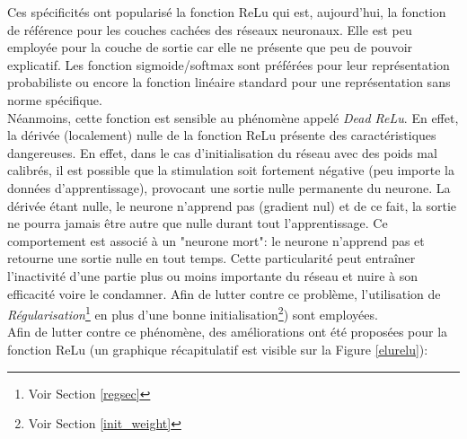 \noindent Ces spécificités ont popularisé la fonction ReLu qui est, aujourd'hui, la fonction de référence pour les couches cachées des réseaux neuronaux. Elle est peu employée pour la couche de sortie car elle ne présente que peu de pouvoir explicatif. Les fonction sigmoide/softmax sont préférées pour leur représentation probabiliste ou encore la fonction linéaire standard pour une représentation sans norme spécifique.\\

\noindent Néanmoins, cette fonction est sensible au phénomène appelé \textit{Dead ReLu}. En effet, la dérivée (localement) nulle de la fonction ReLu présente des caractéristiques dangereuses. En effet, dans le cas d'initialisation du réseau avec des poids mal calibrés, il est possible que la stimulation soit fortement négative (peu importe la données d'apprentissage), provocant une sortie nulle permanente du neurone. La dérivée étant nulle, le neurone n'apprend pas (gradient nul) et de ce fait, la sortie ne pourra jamais être autre que nulle durant tout l'apprentissage. Ce comportement est associé à un "neurone mort": le neurone n'apprend pas et retourne une sortie nulle en tout temps. Cette particularité peut entraîner l'inactivité d'une partie plus ou moins importante du réseau et nuire à son efficacité voire le condamner. Afin de lutter contre ce problème, l'utilisation de \textit{Régularisation}\footnote{Voir Section \ref{regsec}} en plus d'une bonne initialisation\footnote{Voir Section \ref{init_weight}}) sont employées.\\

\noindent Afin de lutter contre ce phénomène, des améliorations ont été proposées pour la fonction ReLu (un graphique récapitulatif est visible sur la Figure \ref{elurelu}):

